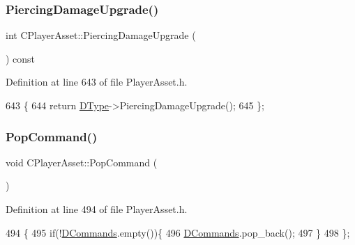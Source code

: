 \subsubsection{\texorpdfstring{Piercing\+Damage\+Upgrade()}{PiercingDamageUpgrade()}}
{\footnotesize\ttfamily int C\+Player\+Asset\+::\+Piercing\+Damage\+Upgrade (\begin{DoxyParamCaption}{ }\end{DoxyParamCaption}) const\hspace{0.3cm}{\ttfamily [inline]}}



Definition at line 643 of file Player\+Asset.\+h.


\begin{DoxyCode}
643                                          \{
644             \textcolor{keywordflow}{return} \hyperlink{classCPlayerAsset_a5d61f73471e1e6f0a6ab15f2ffa7b359}{DType}->PiercingDamageUpgrade();
645         \};
\end{DoxyCode}
\hypertarget{classCPlayerAsset_ae443fc4aa41aaa71d1d553f2ca9d9999}{}\label{classCPlayerAsset_ae443fc4aa41aaa71d1d553f2ca9d9999} 
\subsubsection{\texorpdfstring{Pop\+Command()}{PopCommand()}}
{\footnotesize\ttfamily void C\+Player\+Asset\+::\+Pop\+Command (\begin{DoxyParamCaption}{ }\end{DoxyParamCaption})\hspace{0.3cm}{\ttfamily [inline]}}



Definition at line 494 of file Player\+Asset.\+h.


\begin{DoxyCode}
494                          \{
495             \textcolor{keywordflow}{if}(!\hyperlink{classCPlayerAsset_a4d3b96106d3b1c1020f98005884d2a87}{DCommands}.empty())\{
496                 \hyperlink{classCPlayerAsset_a4d3b96106d3b1c1020f98005884d2a87}{DCommands}.pop\_back();
497             \}
498         \};
\end{DoxyCode}
\hypertarget{classCPlayerAsset_aed5b55f9b2f2771ebac193275d378799}{}\label{classCPlayerAsset_aed5b55f9b2f2771ebac193275d378799} 
